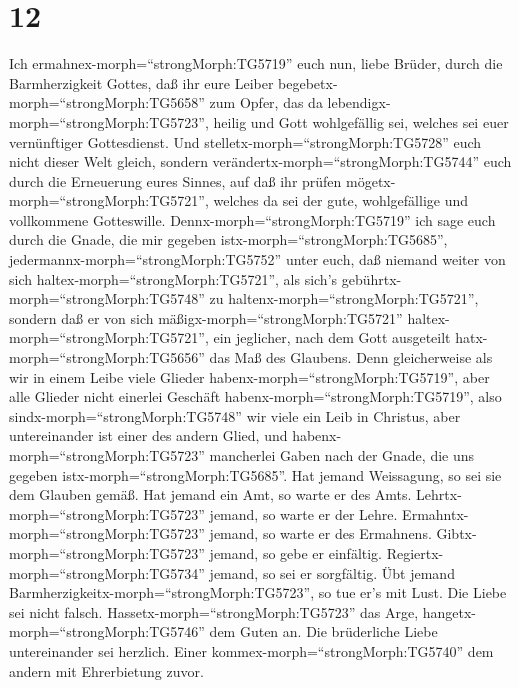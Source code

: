 \hypertarget{section-11}{%
\section{12}\label{section-11}}

 Ich ermahnex-morph=``strongMorph:TG5719'' euch nun, liebe
Brüder, durch die Barmherzigkeit Gottes, daß ihr eure Leiber
begebetx-morph=``strongMorph:TG5658'' zum Opfer, das da
lebendigx-morph=``strongMorph:TG5723'', heilig und Gott wohlgefällig
sei, welches sei euer vernünftiger Gottesdienst.  Und
stelletx-morph=``strongMorph:TG5728'' euch nicht dieser Welt gleich,
sondern verändertx-morph=``strongMorph:TG5744'' euch durch die
Erneuerung eures Sinnes, auf daß ihr prüfen
mögetx-morph=``strongMorph:TG5721'', welches da sei der gute,
wohlgefällige und vollkommene Gotteswille. 
Dennx-morph=``strongMorph:TG5719'' ich sage euch durch die Gnade, die
mir gegeben istx-morph=``strongMorph:TG5685'',
jedermannx-morph=``strongMorph:TG5752'' unter euch, daß niemand weiter
von sich haltex-morph=``strongMorph:TG5721'', als sich's
gebührtx-morph=``strongMorph:TG5748'' zu
haltenx-morph=``strongMorph:TG5721'', sondern daß er von sich
mäßigx-morph=``strongMorph:TG5721'' haltex-morph=``strongMorph:TG5721'',
ein jeglicher, nach dem Gott ausgeteilt
hatx-morph=``strongMorph:TG5656'' das Maß des Glaubens. 
Denn gleicherweise als wir in einem Leibe viele Glieder
habenx-morph=``strongMorph:TG5719'', aber alle Glieder nicht einerlei
Geschäft habenx-morph=``strongMorph:TG5719'',  also
sindx-morph=``strongMorph:TG5748'' wir viele ein Leib in Christus, aber
untereinander ist einer des andern Glied,  und
habenx-morph=``strongMorph:TG5723'' mancherlei Gaben nach der Gnade, die
uns gegeben istx-morph=``strongMorph:TG5685''.  Hat jemand
Weissagung, so sei sie dem Glauben gemäß. Hat jemand ein Amt, so warte
er des Amts. Lehrtx-morph=``strongMorph:TG5723'' jemand, so warte er der
Lehre.  Ermahntx-morph=``strongMorph:TG5723'' jemand, so
warte er des Ermahnens. Gibtx-morph=``strongMorph:TG5723'' jemand, so
gebe er einfältig. Regiertx-morph=``strongMorph:TG5734'' jemand, so sei
er sorgfältig. Übt jemand Barmherzigkeitx-morph=``strongMorph:TG5723'',
so tue er's mit Lust.  Die Liebe sei nicht falsch.
Hassetx-morph=``strongMorph:TG5723'' das Arge,
hangetx-morph=``strongMorph:TG5746'' dem Guten an.  Die
brüderliche Liebe untereinander sei herzlich. Einer
kommex-morph=``strongMorph:TG5740'' dem andern mit Ehrerbietung zuvor.
